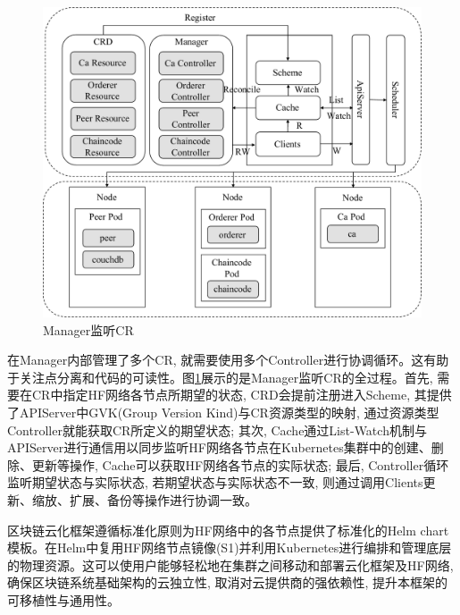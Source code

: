 \begin{figure}[h] %
    \centering %
    \includegraphics[width=1.0\textwidth]{FIGs/chapter5/manager.pdf} %
    \caption{Manager监听CR} %
    \label{manager} %
\end{figure}%

在Manager内部管理了多个CR, 就需要使用多个Controller进行协调循环。这有助于关注点分离和代码的可读性。图\ref{manager}展示的是Manager监听CR的全过程。首先, 需要在CR中指定HF网络各节点所期望的状态, CRD会提前注册进入Scheme, 其提供了APIServer中GVK(Group Version Kind)与CR资源类型的映射, 通过资源类型Controller就能获取CR所定义的期望状态; 其次, Cache通过List-Watch机制与APIServer进行通信用以同步监听HF网络各节点在Kubernetes集群中的创建、删除、更新等操作, Cache可以获取HF网络各节点的实际状态; 最后, Controller循环监听期望状态与实际状态, 若期望状态与实际状态不一致, 则通过调用Clients更新、缩放、扩展、备份等操作进行协调一致。

区块链云化框架遵循标准化原则为HF网络中的各节点提供了标准化的Helm chart模板。在Helm中复用HF网络节点镜像(S1)并利用Kubernetes进行编排和管理底层的物理资源。这可以使用户能够轻松地在集群之间移动和部署云化框架及HF网络, 确保区块链系统基础架构的云独立性, 取消对云提供商的强依赖性, 提升本框架的可移植性与通用性。


